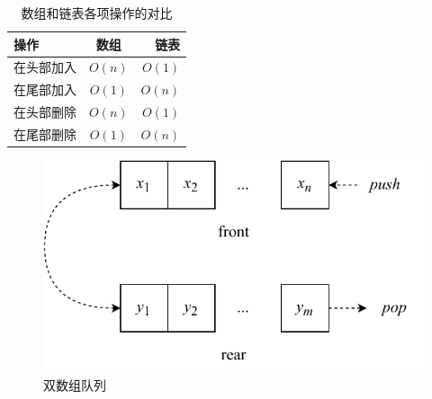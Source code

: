 \documentclass[b5paper]{ctexart}
\begin{document}
\begin{table}[htbp]
\centering
\begin{tabular}{l | c | r}
  \hline
  操作 & 数组 & 链表 \\
  \hline
  在头部加入 & $O(n)$ & $O(1)$ \\
  在尾部加入 & $O(1)$ & $O(n)$ \\
  在头部删除 & $O(n)$ & $O(1)$ \\
  在尾部删除 & $O(1)$ & $O(n)$ \\
  \hline
\end{tabular}
\caption{数组和链表各项操作的对比} \label{tab:array-list-comp}
\end{table}

\begin{figure}[htbp]
  \centering
  \includegraphics[scale=0.6]{img/paired-arrayq}
  \caption{双数组队列}
  \label{fig:horseshoe-array}
\end{figure}

\begin{Exercise}\label{ex:paired-list-queue}
\end{Exercise}
\end{document}
